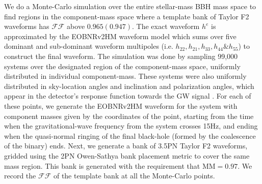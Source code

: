 \documentclass[aps,
prd,
amsmath,
amssymb,
twocolumn,
floatfix,
groupedaddress]{revtex4-1}
\newcommand{\FF}{\mathcal{FF}}
\newcommand{\MM}{\mathrm{MM}}
\begin{document}

We do a Monte-Carlo simulation over the entire stellar-mass BBH mass space to find regions in the component-mass space where a template bank of Taylor F2 waveforms has $\mathcal{FF}$ above $0.965 (0.947)$. The exact waveform $h^e$ is approximated by the EOBNRv2HM waveform model which sums over five dominant and sub-dominant waveform multipoles (i.e. $h_{22},h_{21},h_{33},h_{44}\&h_{55}$) to construct the final waveform.
The simulation was done by sampling 99,000 systems over the designated region of the component-mass space, uniformly distributed in individual component-mass. These systems were also uniformly distributed in sky-location angles and inclination and polarization angles, which appear in the detector's response function towards the GW signal \citep{Sathyaprakash:2009xs}. For each of these points, we generate the EOBNRv2HM waveform for the system with component masses given by the coordinates of the point, starting from the time when the gravitational-wave frequency from the system crosses 15Hz, and ending when the quasi-normal ringing of the final black-hole (formed by the coalescence of the binary) ends. Next, we generate a bank of 3.5PN Taylor F2 waveforms, gridded using the 2PN Owen-Sathya bank placement metric \citep{OwenTemplateSpacing,SathyaBankPlacementTauN,SathyaMetric2PN} to cover the same mass region. This bank is generated with the requirement that $\MM=0.97$. We record the $\mathcal{FF}$ of the 
template bank at all the Monte-Carlo points.
\end{document}
